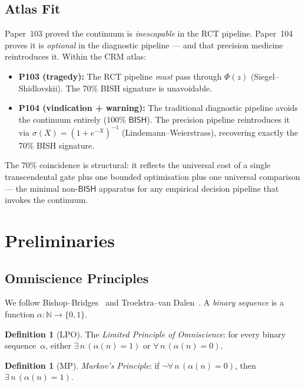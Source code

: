 \documentclass[11pt,a4paper]{article}
\theoremstyle{plain}
\theoremstyle{definition}
\newtheorem{definition}[theorem]{Definition}
\newcommand{\BISH}{\textsf{BISH}}
\newcommand{\N}{\mathbb{N}}
\begin{document}
\subsection{Atlas Fit}

Paper~103 proved the continuum is \emph{inescapable} in the RCT pipeline.  Paper~104 proves it is \emph{optional} in the diagnostic pipeline --- and that precision medicine reintroduces it.  Within the CRM atlas:
\begin{itemize}[nosep]
\item \textbf{P103 (tragedy):} The RCT pipeline \emph{must} pass through $\Phi(z)$ (Siegel--Shidlovskii).  The 70\% BISH signature is unavoidable.
\item \textbf{P104 (vindication + warning):} The traditional diagnostic pipeline avoids the continuum entirely (100\% $\BISH$).  The precision pipeline reintroduces it via $\sigma(X) = (1+e^{-X})^{-1}$ (Lindemann--Weierstrass), recovering exactly the 70\% BISH signature.
\end{itemize}
The 70\% coincidence is structural: it reflects the universal cost of a single transcendental gate plus one bounded optimisation plus one universal comparison --- the minimal non-$\BISH$ apparatus for any empirical decision pipeline that invokes the continuum.

\section{Preliminaries}\label{sec:prelim}

\subsection{Omniscience Principles}

We follow Bishop--Bridges~\cite{bishop-bridges} and Troelstra--van Dalen~\cite{troelstra-vandalen}.  A \emph{binary sequence} is a function $\alpha : \N \to \{0,1\}$.

\begin{definition}[LPO]
The \emph{Limited Principle of Omniscience}: for every binary sequence~$\alpha$, either $\exists\, n\,(\alpha(n)=1)$ or $\forall\, n\,(\alpha(n)=0)$.
\end{definition}

\begin{definition}[MP]
\emph{Markov's Principle}: if $\lnot\forall\, n\,(\alpha(n)=0)$, then $\exists\, n\,(\alpha(n)=1)$.
\end{definition}
\end{document}
